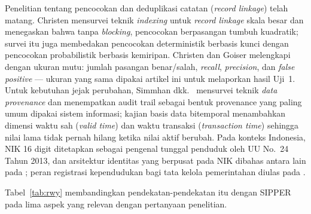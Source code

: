 \documentclass[11pt,a4paper]{article}
\begin{document}
Penelitian tentang pencocokan dan deduplikasi catatan (\emph{record linkage}) telah matang. Christen \cite{christen2012} mensurvei teknik \emph{indexing} untuk \emph{record linkage} skala besar dan menegaskan bahwa tanpa \emph{blocking}, pencocokan berpasangan tumbuh kuadratik; survei itu juga membedakan pencocokan deterministik berbasis kunci dengan pencocokan probabilistik berbasis kemiripan. Christen dan Goiser \cite{christen2007} melengkapi dengan ukuran mutu: jumlah pasangan benar/salah, \emph{recall}, \emph{precision}, dan \emph{false positive} --- ukuran yang sama dipakai artikel ini untuk melaporkan hasil Uji~1. Untuk kebutuhan jejak perubahan, Simmhan dkk.~\cite{simmhan2005} mensurvei teknik \emph{data provenance} dan menempatkan audit trail sebagai bentuk provenance yang paling umum dipakai sistem informasi; kajian basis data bitemporal \cite{neelamegam2026} menambahkan dimensi waktu sah (\emph{valid time}) dan waktu transaksi (\emph{transaction time}) sehingga nilai lama tidak pernah hilang ketika nilai aktif berubah. Pada konteks Indonesia, NIK 16 digit ditetapkan sebagai pengenal tunggal penduduk oleh UU No.~24 Tahun 2013, dan arsitektur identitas yang berpusat pada NIK dibahas antara lain pada \cite{ssrn-nik}; peran registrasi kependudukan bagi tata kelola pemerintahan diulas pada \cite{ejecs}.

Tabel~\ref{tab:rwy} membandingkan pendekatan-pendekatan itu dengan SIPPER pada lima aspek yang relevan dengan pertanyaan penelitian.
\end{document}
